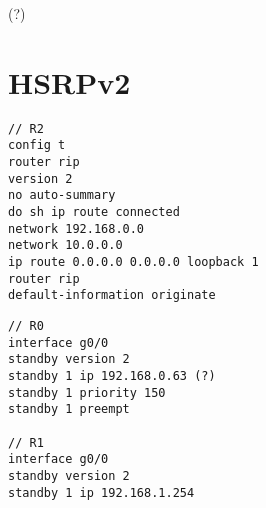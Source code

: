 (?)

\section{HSRPv2}

\begin{verbatim}
// R2
config t
router rip
version 2
no auto-summary
do sh ip route connected
network 192.168.0.0
network 10.0.0.0
ip route 0.0.0.0 0.0.0.0 loopback 1
router rip
default-information originate
\end{verbatim}

\begin{verbatim}
// R0
interface g0/0
standby version 2
standby 1 ip 192.168.0.63 (?)
standby 1 priority 150
standby 1 preempt

// R1
interface g0/0
standby version 2
standby 1 ip 192.168.1.254
\end{verbatim}

